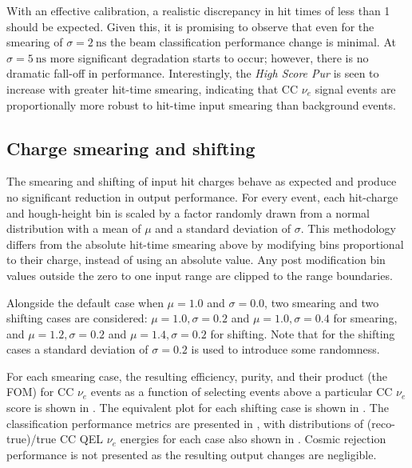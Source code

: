 With an effective calibration, a realistic discrepancy in hit times of less than
\unit{1}{} should be expected. Given this, it is promising to observe that even for the
smearing of $\sigma=2~\text{ns}$ the beam classification performance change is minimal. At
$\sigma=5~\text{ns}$ more significant degradation starts to occur; however, there is no dramatic
fall-off in performance. Interestingly, the \emph{High Score Pur} is seen to increase with greater
hit-time smearing, indicating that CC $\nu_{e}$ signal events are proportionally more robust to
hit-time input smearing than background events.

\subsection{Charge smearing and shifting} %
\label{sec:results_robust_charge} %

The smearing and shifting of input hit charges behave as expected and produce no significant
reduction in output performance. For every event, each hit-charge and hough-height bin is scaled
by a factor randomly drawn from a normal distribution with a mean of $\mu$ and a standard
deviation of $\sigma$. This methodology differs from the absolute hit-time smearing above by
modifying bins proportional to their charge, instead of using an absolute value. Any post
modification bin values outside the zero to one input range are clipped to the range boundaries.

Alongside the default case when $\mu=1.0$ and $\sigma=0.0$, two smearing and two shifting cases
are considered: $\mu=1.0,\sigma=0.2$ and $\mu=1.0,\sigma=0.4$ for smearing, and
$\mu=1.2,\sigma=0.2$ and $\mu=1.4,\sigma=0.2$ for shifting. Note that for the shifting cases a
standard deviation of $\sigma=0.2$ is used to introduce some randomness.

For each smearing case, the resulting efficiency, purity, and their product (the FOM) for CC
$\nu_{e}$ events as a function of selecting events above a particular CC $\nu_{e}$ score is shown
in . The equivalent plot for each shifting case
is shown in . The classification performance
metrics are presented in , with distributions of (reco-true)/true CC QEL
$\nu_{e}$ energies for each case also shown in . Cosmic
rejection performance is not presented as the resulting output changes are negligible.

